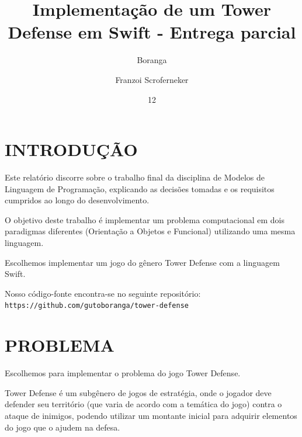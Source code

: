 \documentclass[rel_mlp]{iiufrgs}
\title{Implementação de um Tower Defense em Swift - Entrega parcial}
\author{Boranga}{Augusto} %
\author{Franzoi Scroferneker}{Rodrigo} %
\date{12}{2017}
\newcommand\tab[1][1cm]{\hspace*{#1}}
\begin{document}
\maketitle


\tableofcontents








%

\chapter{INTRODUÇÃO} \label{intro}

Este relatório discorre sobre o trabalho final da disciplina de Modelos de Linguagem de Programação, explicando as decisões tomadas e os requisitos cumpridos ao longo do desenvolvimento.

O objetivo deste trabalho é implementar um problema computacional em dois paradigmas diferentes (Orientação a Objetos e Funcional) utilizando uma mesma linguagem.

Escolhemos implementar um jogo do gênero Tower Defense com a linguagem Swift.

Nosso código-fonte encontra-se no seguinte repositório:
\texttt{\\\tab https://github.com/gutoboranga/tower-defense}

%

\chapter{PROBLEMA} \label{intro}

Escolhemos para implementar o problema do jogo Tower Defense.

Tower Defense é um subgênero de jogos de estratégia, onde o jogador deve defender seu território (que varia de acordo com a temática do jogo) contra o ataque de inimigos, podendo utilizar um montante inicial para adquirir elementos do jogo que o ajudem na defesa.
\end{document}
